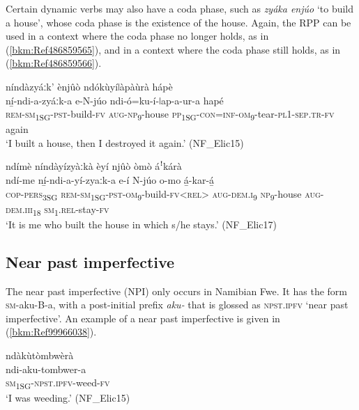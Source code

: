 Certain dynamic verbs may also have a coda phase, such as \textit{zyáka enjúo} ‘to build a house’, whose coda phase is the existence of the house. Again, the RPP can be used in a context where the coda phase no longer holds, as in (\ref{bkm:Ref486859565}), and in a context where the coda phase still holds, as in (\ref{bkm:Ref486859566}).

\ea
\label{bkm:Ref486859565}
níndàzyáːk’ ènjûò ndókùyíǀàpàùrà hápè\\
\gll ní̲-ndi-a-zyáːk-a    e-N-júo ndi-ó=ku-í-ǀap-a-ur-a        hapé \\
\textsc{rem}-\textsc{sm}\textsubscript{1SG}-\textsc{pst}-build-\textsc{fv}  \textsc{aug}-\textsc{np}\textsubscript{9}-house
\textsc{pp}\textsubscript{1SG}-\textsc{con}=\textsc{inf}-\textsc{om}\textsubscript{9}-tear-\textsc{pl}1-\textsc{sep}.\textsc{tr}-\textsc{fv}  again\\
\glt ‘I built a house, then I destroyed it again.’ (NF\_Elic15)
\z

\ea
\label{bkm:Ref486859566}
ndímè níndàyízyàːkà èyí njûò òmò áꜝkárà\\
\gll ndí-me  ní̲-ndi-a-yí-zyaːk-a        e-í    N-júo o-mo      á̲-kar-á̲ \\
\textsc{cop}-\textsc{pers}\textsubscript{3SG}  \textsc{rem}-\textsc{sm}\textsubscript{1SG}-\textsc{pst}-\textsc{om}\textsubscript{9}-build-\textsc{fv}<\textsc{rel}>  \textsc{aug}-\textsc{dem}.\textsc{i}\textsubscript{9}  \textsc{np}\textsubscript{9}-house
\textsc{aug}-\textsc{dem}.\textsc{iii}\textsubscript{18} \textsc{sm}\textsubscript{1}.\textsc{rel}-stay-\textsc{fv}\\
\glt ‘It is me who built the house in which s/he stays.’ (NF\_Elic17)
\z
\subsection{Near past imperfective}
\label{bkm:Ref494480139}\hypertarget{Toc75352683}{}
The near past imperfective (NPI) only occurs in Namibian Fwe. It has the form \textsc{sm}-aku-B-a, with a post-initial prefix \textit{aku-} that is glossed as \textsc{npst}.\textsc{ipfv} ‘near past imperfective’. An example of a near past imperfective is given in (\ref{bkm:Ref99966038}).

\ea
\label{bkm:Ref99966038}
\glll ndàkùtòmbwèrà\\
ndi-aku-tombwer-a\\
\textsc{sm}\textsubscript{1SG}-\textsc{npst}.\textsc{ipfv}-weed-\textsc{fv}\\
\glt ‘I was weeding.’ (NF\_Elic15)
\z

